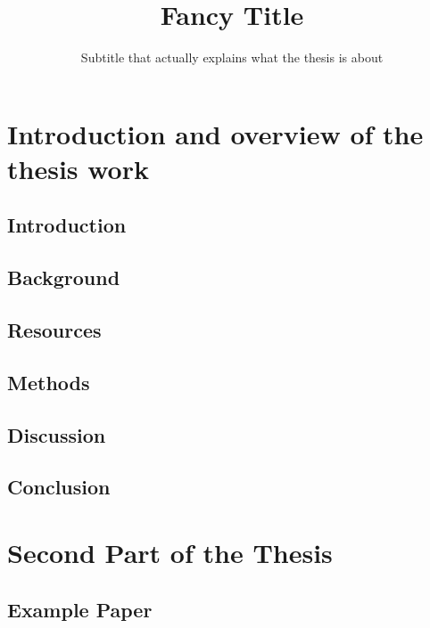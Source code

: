 \documentclass[11pt,a4paper]{DL}
\title{Fancy Title}
\subtitle{Subtitle that actually explains what the thesis is about}
\author{\VarPhdName}
\begin{document}
\maketitle
\frontmatter



\tableofcontents
\mainmatter


\part{Introduction and overview of the thesis work} 
\label{part:kappa}


\chapter{Introduction}
\label{introduction}


\chapter{Background}
\label{background}


\chapter{Resources}
\label{resources}


\chapter{Methods}
\label{methods}


\chapter{Discussion}
\label{discussion}


\chapter{Conclusion}
\label{conclusion}





\part{Second Part of the Thesis}

\chapter{Example Paper}



\printbibliography

\appendix

\backmatter
\end{document}

